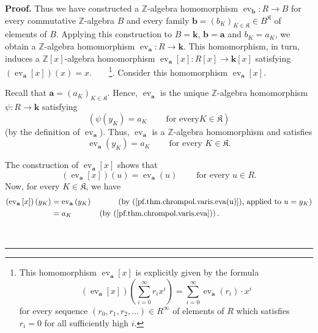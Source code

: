 \documentclass[numbers=enddot,12pt,final,onecolumn,notitlepage]{scrartcl}%
\theoremstyle{definition}
\newenvironment{proof}[1][Proof]{\noindent\textbf{#1.} }{\ \rule{0.5em}{0.5em}}
\newenvironment{verlong}{}{}
\let\sumnonlimits\sum
\renewcommand{\sum}{\sumnonlimits\limits}
\begin{document}
\begin{verlong}
\begin{proof}
Thus we have constructed a $\mathbb{Z}$-algebra homomorphism
$\operatorname*{ev}\nolimits_{\mathbf{b}}:R\rightarrow B$ for every
commutative $\mathbb{Z}$-algebra $B$ and every family $\mathbf{b}=\left(
b_{K}\right)  _{K\in\mathfrak{K}}\in B^{\mathfrak{K}}$ of elements of $B$.
Applying this construction to $B=\mathbf{k}$, $\mathbf{b}=\mathbf{a}$ and
$b_{K}=a_{K}$, we obtain a $\mathbb{Z}$-algebra homomorphism
$\operatorname*{ev}\nolimits_{\mathbf{a}}:R\rightarrow\mathbf{k}$. This
homomorphism, in turn, induces a $\mathbb{Z}\left[  x\right]  $-algebra
homomorphism $\operatorname*{ev}\nolimits_{\mathbf{a}}\left[  x\right]
:R\left[  x\right]  \rightarrow\mathbf{k}\left[  x\right]  $ satisfying
$\left(  \operatorname*{ev}\nolimits_{\mathbf{a}}\left[  x\right]  \right)
\left(  x\right)  =x$.\ \ \ \ \footnote{This homomorphism $\operatorname*{ev}%
\nolimits_{\mathbf{a}}\left[  x\right]  $ is explicitly given by the formula%
\[
\left(  \operatorname*{ev}\nolimits_{\mathbf{a}}\left[  x\right]  \right)
\left(  \sum_{i=0}^{\infty}r_{i}x^{i}\right)  =\sum_{i=0}^{\infty
}\operatorname*{ev}\nolimits_{\mathbf{a}}\left(  r_{i}\right)  \cdot x^{i}%
\]
for every sequence $\left(  r_{0},r_{1},r_{2},\ldots\right)  \in R^{\infty}$
of elements of $R$ which satisfies $r_{i}=0$ for all sufficiently high $i$.}.
Consider this homomorphism $\operatorname*{ev}\nolimits_{\mathbf{a}}\left[
x\right]  $.

Recall that $\mathbf{a}=\left(  a_{K}\right)  _{K\in\mathfrak{K}}$. Hence,
$\operatorname*{ev}\nolimits_{\mathbf{a}}$ is the unique $\mathbb{Z}$-algebra
homomorphism $\psi:R\rightarrow\mathbf{k}$ satisfying%
\[
\left(  \psi\left(  y_{K}\right)  =a_{K}\ \ \ \ \ \ \ \ \ \ \text{for every
}K\in\mathfrak{K}\right)
\]
(by the definition of $\operatorname*{ev}\nolimits_{\mathbf{a}}$). Thus,
$\operatorname*{ev}\nolimits_{\mathbf{a}}$ is a $\mathbb{Z}$-algebra
homomorphism and satisfies%
\begin{equation}
\operatorname*{ev}\nolimits_{\mathbf{a}}\left(  y_{K}\right)  =a_{K}%
\ \ \ \ \ \ \ \ \ \ \text{for every }K\in\mathfrak{K}.
\label{pf.thm.chrompol.varis.eva}%
\end{equation}


The construction of $\operatorname*{ev}\nolimits_{\mathbf{a}}\left[  x\right]
$ shows that
\begin{equation}
\left(  \operatorname*{ev}\nolimits_{\mathbf{a}}\left[  x\right]  \right)
\left(  u\right)  =\operatorname*{ev}\nolimits_{\mathbf{a}}\left(  u\right)
\ \ \ \ \ \ \ \ \ \ \text{for every }u\in R.
\label{pf.thm.chrompol.varis.eva(u)}%
\end{equation}
Now, for every $K\in\mathfrak{K}$, we have%
\begin{align}
\left(  \operatorname*{ev}\nolimits_{\mathbf{a}}\left[  x\right]  \right)
\left(  y_{K}\right)   &  =\operatorname*{ev}\nolimits_{\mathbf{a}}\left(
y_{K}\right)  \ \ \ \ \ \ \ \ \ \ \left(  \text{by
(\ref{pf.thm.chrompol.varis.eva(u)}), applied to }u=y_{K}\right) \nonumber\\
&  =a_{K}\ \ \ \ \ \ \ \ \ \ \left(  \text{by (\ref{pf.thm.chrompol.varis.eva}%
)}\right)  . \label{pf.thm.chrompol.varis.evax}%
\end{align}



\end{proof}
\end{verlong}
\end{document}
